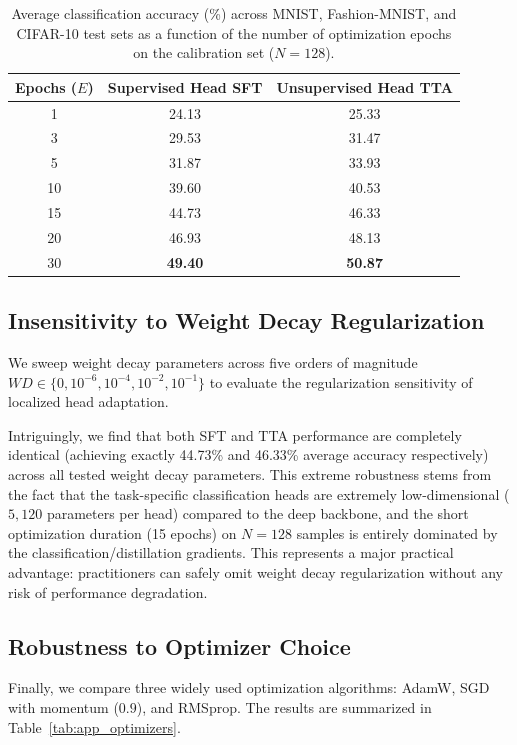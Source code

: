 \documentclass{article}
\theoremstyle{plain}
\theoremstyle{definition}
\theoremstyle{remark}
\begin{document}
\begin{table}[h]
\caption{Average classification accuracy (\%) across MNIST, Fashion-MNIST, and CIFAR-10 test sets as a function of the number of optimization epochs on the calibration set ($N=128$).}
\label{tab:app_epochs}
\begin{center}
\begin{tabular}{ccc}
\toprule
\textbf{Epochs ($E$)} & \textbf{Supervised Head SFT} & \textbf{Unsupervised Head TTA} \\
\midrule
1 & 24.13 & 25.33 \\
3 & 29.53 & 31.47 \\
5 & 31.87 & 33.93 \\
10 & 39.60 & 40.53 \\
15 & 44.73 & 46.33 \\
20 & 46.93 & 48.13 \\
30 & \textbf{49.40} & \textbf{50.87} \\
\bottomrule
\end{tabular}
\end{center}
\end{table}

\subsection{Insensitivity to Weight Decay Regularization}
We sweep weight decay parameters across five orders of magnitude $WD \in \{0, 10^{-6}, 10^{-4}, 10^{-2}, 10^{-1}\}$ to evaluate the regularization sensitivity of localized head adaptation.

Intriguingly, we find that both SFT and TTA performance are completely identical (achieving exactly 44.73\% and 46.33\% average accuracy respectively) across all tested weight decay parameters. This extreme robustness stems from the fact that the task-specific classification heads are extremely low-dimensional ($5,120$ parameters per head) compared to the deep backbone, and the short optimization duration (15 epochs) on $N=128$ samples is entirely dominated by the classification/distillation gradients. This represents a major practical advantage: practitioners can safely omit weight decay regularization without any risk of performance degradation.

\subsection{Robustness to Optimizer Choice}
Finally, we compare three widely used optimization algorithms: AdamW, SGD with momentum ($0.9$), and RMSprop. The results are summarized in Table~\ref{tab:app_optimizers}.
\end{document}
